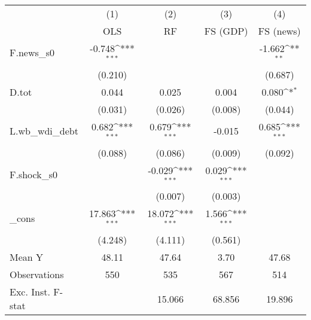 {
\def\sym#1{\ifmmode^{#1}\else\(^{#1}\)\fi}
\begin{tabular}{l*{4}{c}}
\toprule
            &\multicolumn{1}{c}{(1)}&\multicolumn{1}{c}{(2)}&\multicolumn{1}{c}{(3)}&\multicolumn{1}{c}{(4)}\\
            &\multicolumn{1}{c}{OLS}&\multicolumn{1}{c}{RF}&\multicolumn{1}{c}{FS (GDP)}&\multicolumn{1}{c}{FS (news)}\\
\midrule
F.news\_s0   &      -0.748\sym{***}&                     &                     &      -1.662\sym{**} \\
            &     (0.210)         &                     &                     &     (0.687)         \\
\addlinespace
D.tot       &       0.044         &       0.025         &       0.004         &       0.080\sym{*}  \\
            &     (0.031)         &     (0.026)         &     (0.008)         &     (0.044)         \\
\addlinespace
L.wb\_wdi\_debt&       0.682\sym{***}&       0.679\sym{***}&      -0.015         &       0.685\sym{***}\\
            &     (0.088)         &     (0.086)         &     (0.009)         &     (0.092)         \\
\addlinespace
F.shock\_s0  &                     &      -0.029\sym{***}&       0.029\sym{***}&                     \\
            &                     &     (0.007)         &     (0.003)         &                     \\
\addlinespace
\_cons      &      17.863\sym{***}&      18.072\sym{***}&       1.566\sym{***}&                     \\
            &     (4.248)         &     (4.111)         &     (0.561)         &                     \\
\midrule
Mean Y      &       48.11         &       47.64         &        3.70         &       47.68         \\
Observations&         550         &         535         &         567         &         514         \\
Exc. Inst. F-stat&                     &      15.066         &      68.856         &      19.896         \\
\bottomrule
\end{tabular}
}
